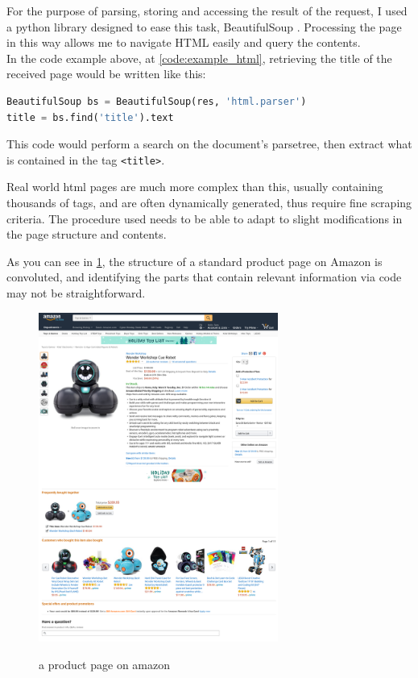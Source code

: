 \documentclass[LaM,binding=0.6cm]{sapthesis}
\begin{document}
For the purpose of parsing, storing and accessing the result of the request, I used a python library designed to ease this task, BeautifulSoup \cite{noauthor_beautiful_nodate}. Processing the page in this way allows me to navigate HTML easily and query the contents. \\

In the code example above, at \ref{code:example_html}, retrieving the title of the received page would be written like this:
\begin{lstlisting}[language=Python]
BeautifulSoup bs = BeautifulSoup(res, 'html.parser')
title = bs.find('title').text
\end{lstlisting}
This code would perform a search on the document's parsetree, then extract what is contained in the tag \texttt{<title>}.


Real world html pages are much more complex than this, usually containing thousands of tags, and are often dynamically generated, thus require fine scraping criteria. The procedure used needs to be able to adapt to slight modifications in the page structure and contents.

As you can see in \ref{fig:amazon-page}, the structure of a standard product page on Amazon is convoluted, and identifying the parts that contain relevant information via code may not be straightforward. 

\begin{figure}
\centering
\includegraphics[width=0.7\textwidth]{pictures/amazon_page.png}\\[3ex]
\caption{a product page on amazon}
\label{fig:amazon-page}
\end{figure}
\end{document}
